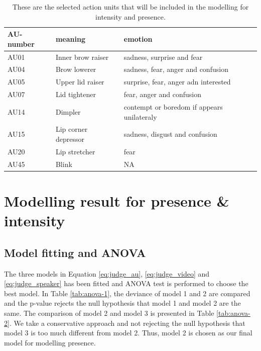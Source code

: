 \documentclass{monashthesis}
\begin{document}
\begin{table}[ht]
\begin{center}
\caption{\label{tab:au-included} These are the selected action units that will be included in the modelling for intensity and presence.}
\begin{tabular}{lll}
\toprule
AU-number & meaning & emotion \\
\midrule
AU01 & Inner brow raiser & sadness, surprise and fear \\
AU04 & Brow lowerer & sadness, fear, anger and confusion \\
AU05 & Upper lid raiser & surprise, fear, anger adn interested \\
AU07 & Lid tightener & fear, anger and confusion \\
AU14 & Dimpler & contempt or boredom if appears unilateraly \\
AU15 & Lip corner depressor & sadness, disgust and confusion \\
AU20 & Lip stretcher & fear \\
AU45 & Blink & NA \\
\bottomrule
\end{tabular}
\end{center}
\end{table}

\newpage

\hypertarget{modelling-result-for-presence-intensity}{%
\section{Modelling result for presence \& intensity}\label{modelling-result-for-presence-intensity}}

\hypertarget{model-fitting-and-anova}{%
\subsection{Model fitting and ANOVA}\label{model-fitting-and-anova}}

The three models in Equation \ref{eq:judge_au}, \ref{eq:judge_video} and \ref{eq:judge_speaker} has been fitted and ANOVA test is performed to choose the best model. In Table \ref{tab:anova-1}, the deviance of model 1 and 2 are compared and the p-value rejects the null hypothesis that model 1 and model 2 are the same. The comparison of model 2 and model 3 is presented in Table \ref{tab:anova-2}. We take a conservative approach and not rejecting the null hypothesis that model 3 is too much different from model 2. Thus, model 2 is chosen as our final model for modelling presence.
\end{document}
